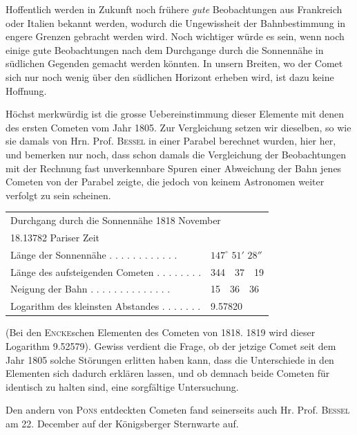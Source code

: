 \par\indent Hoffentlich werden in Zukunft noch frühere \emph{gute} Beobachtungen aus Frankreich
oder Italien bekannt werden, wodurch die Ungewissheit der Bahnbestimmung in engere
Grenzen gebracht werden wird. Noch wichtiger würde es sein, wenn noch einige gute
Beobachtungen nach dem Durchgange durch die Sonnennähe in südlichen Gegenden gemacht
werden könnten. In unsern Breiten, wo der Comet sich nur noch wenig über den südlichen
Horizont erheben wird, ist dazu keine Hoffnung.

\par\indent Höchst merkwürdig ist die grosse Uebereinstimmung dieser Elemente mit denen des ersten
Cometen vom Jahr 1805. Zur Vergleichung setzen wir dieselben, so wie sie damals von Hrn.
Prof. \textsc{Bessel} in einer Parabel berechnet wurden, hier her, und bemerken nur noch, dass
schon damals die Vergleichung der Beobachtungen mit der Rechnung fast unverkennbare
Spuren einer Abweichung der Bahn jenes Cometen von der Parabel zeigte, die jedoch von
keinem Astronomen weiter verfolgt zu sein scheinen.

\begin{center}
\begin{tabular}{l l}
\multicolumn{2}{l}{Durchgang durch die Sonnennähe 1818 November} \\
\multicolumn{2}{l}{18.13782 Pariser Zeit} \\
Länge der Sonnennähe . . . . . . . . . . . . & $147^\circ$ $51'$ $28''$ \\
Länge des aufsteigenden Cometen . . . . . . . . & 344\ \ 37\ \ 19 \\
Neigung der Bahn . . . . . . . . . . . . . . & 15\ \ 36\ \ 36 \\
Logarithm des kleinsten Abstandes . . . . . . . & 9.57820 \\
\end{tabular}
\end{center}

\noindent (Bei den \textsc{Encke}schen Elementen des Cometen von 1818. 1819 wird dieser Logarithm
9.52579). Gewiss verdient die Frage, ob der jetzige Comet seit dem Jahr 1805 solche
Störungen erlitten haben kann, dass die Unterschiede in den Elementen sich dadurch
erklären lassen, und ob demnach beide Cometen für identisch zu halten sind, eine
sorgfältige Untersuchung.

\par\indent Den andern von \textsc{Pons} entdeckten Cometen fand seinerseits auch Hr. Prof. \textsc{Bessel} am 22.
December auf der Königsberger Sternwarte auf.

